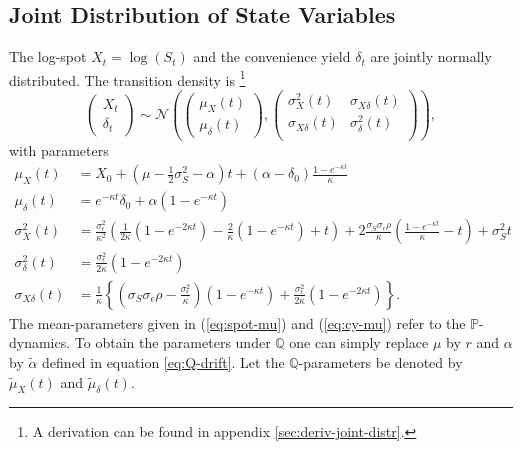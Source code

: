 \documentclass[a4paper,11pt]{article}
\newcommand{\sigmaS}{\sigma_S}
\newcommand{\sigmaE}{\sigma_\epsilon}
\begin{document}
\subsection{Joint Distribution of State Variables}
The log-spot $X_t = \log(S_t)$ and the convenience yield $\delta_t$
are jointly normally distributed. The transition density is
\footnote{A derivation can be found in appendix
  \ref{sec:deriv-joint-distr}.}
\begin{equation}
\label{jointDist}
\begin{pmatrix}X_t \\ \delta_t \end{pmatrix} \sim
\mathcal{N}\left( \begin{pmatrix}\mu_X(t) \\
    \mu_\delta(t) \end{pmatrix},
  \begin{pmatrix}\sigma_X^2(t) & \sigma_{X\delta}(t)  \\ \sigma_{X\delta}(t) & \sigma_\delta^2(t)  \\
    \end{pmatrix} \right),
\end{equation}
with parameters
\begin{align}
  \mu_X(t) &= X_0 + \left(\mu - \frac{1}{2}\sigmaS^2 - \alpha\right) t
  + \left(\alpha  - \delta_0\right) \frac{1 - e^{-\kappa t}}{\kappa}\label{eq:spot-mu}\\
  \mu_\delta(t) &= e^{-\kappa t}\delta_0 + \alpha \left(1 - e^{-\kappa
      t}\right)\label{eq:cy-mu}\\
  \sigma_X^2(t) &= \frac{\sigmaE^2}{\kappa^2}
  \left(\frac{1}{2\kappa}\left(1 - e^{-2\kappa t}\right) -
    \frac{2}{\kappa}\left(1 - e^{-\kappa t}\right) + t\right) +
  2\frac{\sigmaS\sigmaE\rho}{\kappa} \left(\frac{1 - e^{-\kappa
        t}}{\kappa} - t\right) + \sigma^2_St \label{eq:spot-var}\\
  \sigma_\delta^2(t) &= \frac{\sigmaE^2}{2\kappa}\left(1 -
    e^{-2\kappa t}\right) \label{eq:cy-var}\\
  \sigma_{X\delta}(t) &= \frac{1}{\kappa}\left\{\left(\sigmaS\sigmaE\rho -
      \frac{\sigmaE^2}{\kappa}\right)\left(1 - e^{-\kappa t}\right) +
    \frac{\sigmaE^2}{2\kappa}\left(1 - e^{-2\kappa
        t}\right)\right\}\label{eq:spot-cov}.
\end{align}
The mean-parameters given in (\ref{eq:spot-mu}) and
(\ref{eq:cy-mu}) refer to the $\mathbb{P}$-dynamics. To obtain the
parameters under $\mathbb{Q}$ one can simply replace $\mu$ by $r$ and
$\alpha$ by $\tilde{\alpha}$ defined in equation \ref{eq:Q-drift}. Let
the $\mathbb{Q}$-parameters be denoted by $\tilde{\mu}_X(t)$ and
$\tilde{\mu}_{\delta}(t)$.
\end{document}
